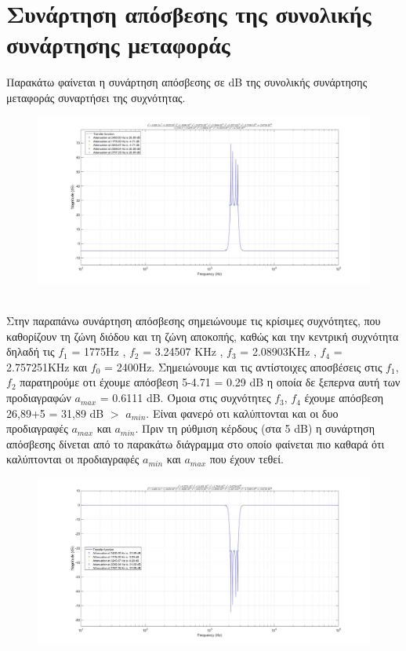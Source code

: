 \documentclass{article}
\begin{document}
{{\section*{Συνάρτηση απόσβεσης της συνολικής συνάρτησης μεταφοράς} 
Παρακάτω φαίνεται η συνάρτηση απόσβεσης σε dB της συνολικής συνάρτησης μεταφοράς συναρτήσει της συχνότητας. 
\begin{figure}[h!]
\centering
 	\advance\leftskip-4.1cm
  \includegraphics[width=205mm,scale=2]{thema3/matlab6.jpg}
\end{figure}  \\
Στην παραπάνω συνάρτηση απόσβεσης σημειώνουμε τις κρίσιμες συχνότητες, που καθορίζουν τη ζώνη διόδου και τη ζώνη αποκοπής, καθώς και την κεντρική συχνότητα δηλαδή τις $f_1$ = 1775Hz , $f_2$ = 3.24507 KHz , $f_3$ = 2.08903KHz , $f_4$ = 2.757251KHz και $f_0$ = 2400Hz. Σημειώνουμε και τις αντίστοιχες αποσβέσεις στις $f_1$, $f_2$ παρατηρούμε οτι έχουμε απόσβεση 5-4.71 = 0.29 dB η οποία δε ξεπερνα αυτή των προδιαγραφών $a_{max}$ = 0.6111 dB. Όμοια στις συχνότητες $f_3$, $f_4$ έχουμε απόσβεση 26,89+5 = 31,89 dB $>$ $a_{min}$. Είναι φανερό οτι καλύπτονται και οι δυο προδιαγραφές $a_{max}$ και $a_{min}$.
\clearpage
Πριν τη ρύθμιση κέρδους (στα 5 dB) η συνάρτηση απόσβεσης δίνεται από το παρακάτω διάγραμμα στο οποίο φαίνεται πιο καθαρά ότι καλύπτονται οι προδιαγραφές $a_{min}$ και $a_{max}$ που έχουν τεθεί.
\begin{figure}[h!]
\centering
 	\advance\leftskip-3cm
  \includegraphics[width=180mm,scale=2]{thema3/matlab7.jpg}

\end{figure}}}
\end{document}
